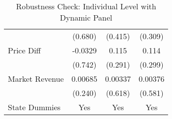 \begin{table}[]
\begin{tabular}{@{}lccc@{}}
                                   & (0.680)    & (0.415)    & (0.309)    \\
Price Diff                         & -0.0329    & 0.115      & 0.114      \\
                                   & (0.742)    & (0.291)    & (0.299)    \\
Market Revenue                     & 0.00685    & 0.00337    & 0.00376    \\
                                   & (0.240)    & (0.618)    & (0.581)    \\
State Dummies                      & Yes        & Yes        & Yes        \\ \bottomrule
\end{tabular}
\caption{Robustness Check: Individual Level with Dynamic Panel}
\label{rob_ind_dynamic}
\end{table}